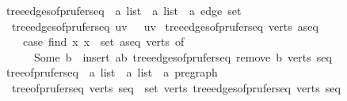 \begin{isabellebox}
    \isamarkupfalse%
    \ tree{\isacharunderscore}{\kern0pt}edges{\isacharunderscore}{\kern0pt}of{\isacharunderscore}{\kern0pt}prufer{\isacharunderscore}{\kern0pt}seq\ {\isacharcolon}{\kern0pt}{\isacharcolon}{\kern0pt}\ {\isachardoublequoteopen}{\isacharprime}{\kern0pt}a\ list\ {\isasymRightarrow}\ {\isacharprime}{\kern0pt}a\ list\ {\isasymRightarrow}\ {\isacharprime}{\kern0pt}a\ edge\ set{\isachardoublequoteclose}\ \isanewline
    \ \ {\isachardoublequoteopen}tree{\isacharunderscore}{\kern0pt}edges{\isacharunderscore}{\kern0pt}of{\isacharunderscore}{\kern0pt}prufer{\isacharunderscore}{\kern0pt}seq\ {\isacharbrackleft}{\kern0pt}u{\isacharcomma}{\kern0pt}v{\isacharbrackright}{\kern0pt}\ {\isacharbrackleft}{\kern0pt}{\isacharbrackright}{\kern0pt}\ {\isacharequal}{\kern0pt}\ {\isacharbraceleft}{\kern0pt}{\isacharbraceleft}{\kern0pt}u{\isacharcomma}{\kern0pt}v{\isacharbraceright}{\kern0pt}{\isacharbraceright}{\kern0pt}{\isachardoublequoteclose}\isanewline
    {\isacharbar}{\kern0pt}\ {\isachardoublequoteopen}tree{\isacharunderscore}{\kern0pt}edges{\isacharunderscore}{\kern0pt}of{\isacharunderscore}{\kern0pt}prufer{\isacharunderscore}{\kern0pt}seq\ verts\ {\isacharparenleft}{\kern0pt}a{\isacharhash}{\kern0pt}seq{\isacharparenright}{\kern0pt}\ {\isacharequal}{\kern0pt}\isanewline
    \ \ \ \ {\isacharparenleft}{\kern0pt}case\ find\ {\isacharparenleft}{\kern0pt}{\isasymlambda}x{\isachardot}{\kern0pt}\ x\ {\isasymnotin}\ set\ {\isacharparenleft}{\kern0pt}a{\isacharhash}{\kern0pt}seq{\isacharparenright}{\kern0pt}{\isacharparenright}{\kern0pt}\ verts\ of\isanewline
    \ \ \ \ \ \ Some\ b\ {\isasymRightarrow}\ insert\ {\isacharbraceleft}{\kern0pt}a{\isacharcomma}{\kern0pt}b{\isacharbraceright}{\kern0pt}\ {\isacharparenleft}{\kern0pt}tree{\isacharunderscore}{\kern0pt}edges{\isacharunderscore}{\kern0pt}of{\isacharunderscore}{\kern0pt}prufer{\isacharunderscore}{\kern0pt}seq\ {\isacharparenleft}{\kern0pt}remove{}\ b\ verts{\isacharparenright}{\kern0pt}\ seq{\isacharparenright}{\kern0pt}{\isacharparenright}{\kern0pt}{\isachardoublequoteclose}\isanewline
    \isanewline
    \isamarkupfalse%
    \ tree{\isacharunderscore}{\kern0pt}of{\isacharunderscore}{\kern0pt}prufer{\isacharunderscore}{\kern0pt}seq\ {\isacharcolon}{\kern0pt}{\isacharcolon}{\kern0pt}\ {\isachardoublequoteopen}{\isacharprime}{\kern0pt}a\ list\ {\isasymRightarrow}\ {\isacharprime}{\kern0pt}a\ list\ {\isasymRightarrow}\ {\isacharprime}{\kern0pt}a\ pregraph{\isachardoublequoteclose}\ \isanewline
    \ \ {\isachardoublequoteopen}tree{\isacharunderscore}{\kern0pt}of{\isacharunderscore}{\kern0pt}prufer{\isacharunderscore}{\kern0pt}seq\ verts\ seq\ {\isacharequal}{\kern0pt}\ {\isacharparenleft}{\kern0pt}set\ verts{\isacharcomma}{\kern0pt}\ tree{\isacharunderscore}{\kern0pt}edges{\isacharunderscore}{\kern0pt}of{\isacharunderscore}{\kern0pt}prufer{\isacharunderscore}{\kern0pt}seq\ verts\ seq{\isacharparenright}{\kern0pt}{\isachardoublequoteclose}
\end{isabellebox}

